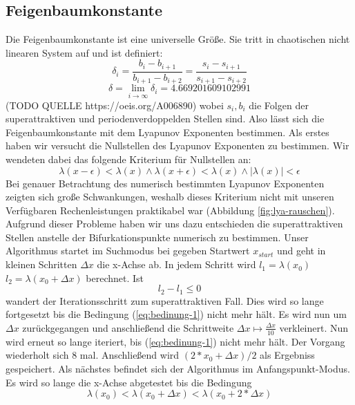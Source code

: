 \documentclass{scrartcl}
\begin{document}
\subsection{Feigenbaumkonstante}
Die Feigenbaumkonstante ist eine universelle Größe. Sie tritt in chaotischen nicht linearen System auf und ist definiert:
\begin{equation}\delta_i = \frac{b_i-b_{i+1}}{b_{i+1}-b_{i+2}}=\frac{s_i-s_{i+1}}{s_{i+1}-s_{i+2}}\end{equation}
\begin{equation}\delta = \lim\limits_{i \rightarrow \infty}{\delta_i} = 4.669201609102991\end{equation} 
(TODO QUELLE https://oeis.org/A006890)
wobei $s_i, b_i$ die Folgen der superattraktiven und periodenverdoppelden Stellen sind.
Also lässt sich die Feigenbaumkonstante mit dem Lyapunov Exponenten bestimmen. 
Als erstes haben wir versucht die Nullstellen des Lyapunov Exponenten zu bestimmen. Wir wendeten dabei das folgende Kriterium für Nullstellen an:
\begin{equation}
\lambda(x-\epsilon) < \lambda(x) \wedge \lambda(x+\epsilon) < \lambda(x) \wedge |\lambda(x)|<\epsilon
\end{equation}
Bei genauer Betrachtung des numerisch bestimmten Lyapunov Exponenten zeigten sich große Schwankungen, weshalb dieses Kriterium nicht mit unseren Verfügbaren Rechenleistungen praktikabel war (Abbildung \ref{fig:lya-rauschen}).
Aufgrund dieser Probleme
haben wir uns dazu entschieden die superattraktiven Stellen anstelle der Bifurkationspunkte numerisch zu bestimmen. Unser Algorithmus startet im Suchmodus bei gegeben Startwert $x_{start}$ und geht in kleinen Schritten $\Delta x$ die x-Achse ab. In jedem Schritt wird $l_1=\lambda(x_0)$ $l_2=\lambda(x_0 + \Delta x)$ berechnet. 
Ist
\begin{equation}
l_2-l_1 \leq 0 
\label{eq:bedinung-1}
\end{equation}
wandert der Iterationsschritt zum superattraktiven Fall. 
Dies wird so lange fortgesetzt bis die Bedingung (\ref{eq:bedinung-1}) nicht mehr hält. 
Es wird nun um $\Delta x$ zurückgegangen und anschließend die Schrittweite $\Delta x \mapsto \frac{\Delta x}{10} $ verkleinert. Nun wird erneut so lange iteriert, bis (\ref{eq:bedinung-1}) nicht mehr hält. 
Der Vorgang wiederholt sich 8 mal. Anschließend wird $(2*x_0 + \Delta x )/2$ als Ergebniss gespeichert. 
Als nächstes befindet sich der Algorithmus im Anfangspunkt-Modus. Es wird so lange die x-Achse abgetestet bis die Bedingung 
\begin{equation}
\lambda(x_0) < \lambda(x_0 + \Delta x) < \lambda(x_0 + 2*\Delta x)
\end{equation}
\end{document}
